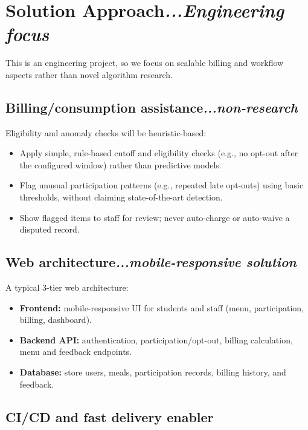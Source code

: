 \documentclass[12pt,a4paper]{article}
\newcommand{\secann}[1]{\hfill\normalfont\itshape #1}
\begin{document}
\section{Solution Approach\secann{...Engineering focus}}

This is an engineering project, so we focus on scalable billing and workflow
aspects rather than novel algorithm research.

\subsection{Billing/consumption assistance\secann{...non-research}}

Eligibility and anomaly checks will be heuristic-based:

\begin{itemize}
    \item Apply simple, rule-based cutoff and eligibility checks (e.g., no
    opt-out after the configured window) rather than predictive models.
    \item Flag unusual participation patterns (e.g., repeated late opt-outs)
    using basic thresholds, without claiming state-of-the-art detection.
    \item Show flagged items to staff for review; never auto-charge or
    auto-waive a disputed record.
\end{itemize}

\subsection{Web architecture\secann{...mobile-responsive solution}}

A typical 3-tier web architecture:

\begin{itemize}
    \item \textbf{Frontend:} mobile-responsive UI for students and staff
    (menu, participation, billing, dashboard).
    \item \textbf{Backend API:} authentication, participation/opt-out,
    billing calculation, menu and feedback endpoints.
    \item \textbf{Database:} store users, meals, participation records,
    billing history, and feedback.
\end{itemize}

\subsection{CI/CD and fast delivery enabler}
\end{document}
